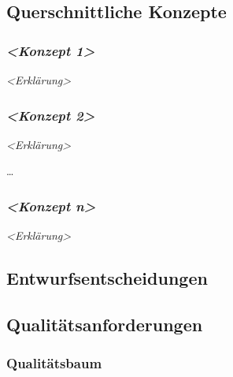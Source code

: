 


\subsection{Querschnittliche Konzepte}\label{section-concepts}

\subsubsection{\texorpdfstring{\emph{\textless{}Konzept
1\textgreater{}}}{\textless{}Konzept 1\textgreater{}}}\label{__emphasis_konzept_1_emphasis}

\emph{\textless{}Erklärung\textgreater{}}

\subsubsection{\texorpdfstring{\emph{\textless{}Konzept
2\textgreater{}}}{\textless{}Konzept 2\textgreater{}}}\label{__emphasis_konzept_2_emphasis}

\emph{\textless{}Erklärung\textgreater{}}

\ldots{}

\subsubsection{\texorpdfstring{\emph{\textless{}Konzept
n\textgreater{}}}{\textless{}Konzept n\textgreater{}}}\label{__emphasis_konzept_n_emphasis}

\emph{\textless{}Erklärung\textgreater{}}

\subsection{Entwurfsentscheidungen}\label{section-design-decisions}

\subsection{Qualitätsanforderungen}\label{section-quality-scenarios}

\subsubsection{Qualitätsbaum}\label{_qualit_tsbaum}

